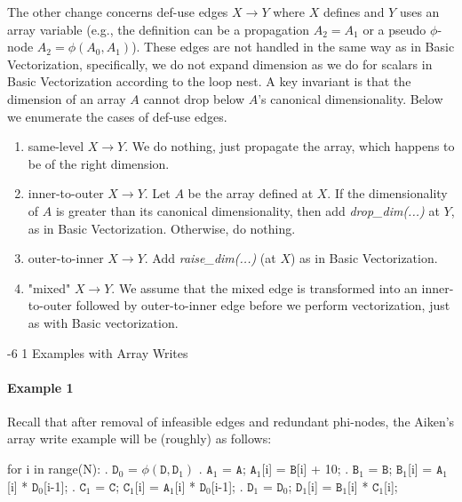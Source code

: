 \documentclass[sigconf, screen, natbib=false, dvipsnames, table]{acmart}
\makeatletter
\renewcommand{\subsubsection}{\@startsection{subsubsection}{3}{\z@}%
                        {-6\p@ \@plus -4\p@ \@minus -4\p@}%
                        {1\p@ \@plus 1\p@ \@minus 0\p@}%
                        {\normalfont\normalsize\bfseries\boldmath}}
\theoremstyle{definition}
\makeatother
\begin{document}
The other change concerns def-use edges $X \rightarrow Y$ where $X$ defines and $Y$ uses an array variable (e.g., the definition can be a propagation $A_2 = A_1$ or a pseudo $\phi$-node $A_2 = \phi(A_0,A_1)$). These edges are not handled in the same way as in Basic Vectorization, specifically, we do not expand dimension as we do for scalars in Basic Vectorization according to the loop nest. A key invariant is that the dimension of an array $A$ cannot drop below $A$'s canonical dimensionality. Below we enumerate the cases of def-use edges.

\begin{enumerate}

\item same-level $X \rightarrow Y$. We do nothing, just propagate the array, which happens to be of the right dimension. 

\item inner-to-outer $X \rightarrow Y$. Let $A$ be the array defined at $X$. If the dimensionality of $A$ is greater than its canonical dimensionality, then add \emph{drop\_dim(...)} at $Y$, as in Basic Vectorization. Otherwise, do nothing.

\item outer-to-inner $X \rightarrow Y$. Add \emph{raise\_dim(...)} (at $X$) as in Basic Vectorization.

\item "mixed" $X \rightarrow Y$. We assume that the mixed edge is transformed into an inner-to-outer followed by outer-to-inner edge before we perform vectorization, just as with Basic vectorization.

\end{enumerate}

\subsubsection{Examples with Array Writes}

\paragraph{Example 1}

Recall that after removal of infeasible edges and redundant phi-nodes, the Aiken's array write example will be (roughly) as follows:

\begin{algorithmic}
\STATE for i in range(N):
. $\texttt{D}_0$ = $\phi(\texttt{D},\texttt{D}_1)$
. $\texttt{A}_1$ = $\texttt{A}$; $\texttt{A}_1$[i] = $\texttt{B}$[i] + 10;
. $\texttt{B}_1$ = $\texttt{B}$; $\texttt{B}_1$[i] = $\texttt{A}_1$[i] * $\texttt{D}_0$[i-1];
. $\texttt{C}_1$ = $\texttt{C}$; $\texttt{C}_1$[i] = $\texttt{A}_1$[i] * $\texttt{D}_0$[i-1];
. $\texttt{D}_1$ = $\texttt{D}_0$; $\texttt{D}_1$[i] = $\texttt{B}_1$[i] * $\texttt{C}_1$[i];
\end{algorithmic}
\end{document}
